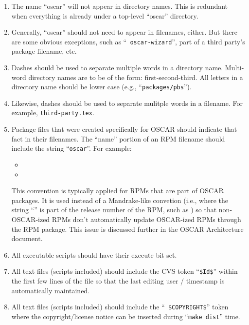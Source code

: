 \begin{enumerate}
\item The name ``oscar'' will not appear in directory names.  This is
  redundant when everything is already under a top-level ``oscar''
  directory.
  
\item Generally, ``oscar'' should not need to appear in filenames,
  either.  But there are some obvious exceptions, such as ``{\tt
    oscar-wizard}'', part of a third party's package filename, etc.
  
\item Dashes should be used to separate multiple words in a directory
  name.  Multi-word directory names are to be of the form:
  first-second-third.  All letters in a directory name should be lower
  case (e.g., ``{\tt packages/pbs}'').

\item Likewise, dashes should be used to separate mulitple words in a
  filename.  For example, {\tt third-party.tex}.
  
\item Package files that were created specifically for OSCAR should
  indicate that fact in their filenames.  The ``name'' portion of an
  RPM filename should include the string ``{\tt oscar}''.  For
  example:

  \begin{itemize}
  \item {}
  \item {}
  \end{itemize}

  \begin{rationale}
    This convention is typically applied for RPMs that are part of
    OSCAR packages.  It is used instead of a Mandrake-like convetion
    (i.e., where the string ``'' is part of the release
    number of the RPM, such as ) so that non-OSCAR-ized RPMs don't
    automatically update OSCAR-ized RPMs through the RPM
     package.  This issue is discussed further in
    the OSCAR Architecture document.
  \end{rationale}

\item All executable scripts should have their execute bit set.
  
\item All text files (scripts included) should include the CVS token
  ``{\tt \$Id\$}'' within the first few lines of the file so that the
  last editing user / timestamp is automatically maintained.
  
\item All text files (scripts included) should include the ``{\tt
    \$COPYRIGHT\$}'' token where the copyright/license notice can be
  inserted during ``{\tt make dist}'' time.

\end{enumerate}


